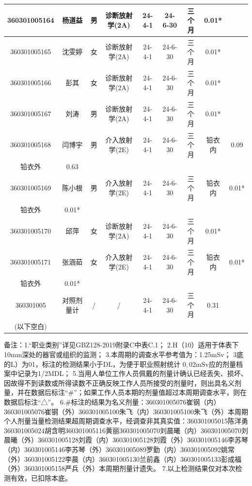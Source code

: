 \begin{table}[H]
\centering
\begin{tabular}{|c|c|c|c|c|c|c|c|c|}
\hline
360301005164 & 杨道益 & 男 & 诊断放射学(2A) & 24-4-1 & 24-6-30 & 三个月 & 0.01* &  \\
\hline
360301005165 & 沈雯婷 & 女 & 诊断放射学(2A) & 24-4-1 & 24-6-30 & 三个月 & 0.01* &  \\
\hline
360301005166 & 彭其 & 女 & 诊断放射学(2A) & 24-4-1 & 24-6-30 & 三个月 & 0.01* &  \\
\hline
360301005167 & 刘涛 & 男 & 诊断放射学(2A) & 24-4-1 & 24-6-30 & 三个月 & 0.01* &  \\
\hline
360301005168 & 闫博宇 & 男 & 介入放射学(2E) & 24-4-1 & 24-6-30 & 三个月 & 铅衣内 & 0.09 \\
\hline
铅衣外 & 0.63 &  &  &  &  &  &  &  \\
\hline
360301005169 & 陈小根 & 男 & 介入放射学(2E) & 24-4-1 & 24-6-30 & 三个月 & 铅衣内 & 0.01* \\
\hline
铅衣外 & 0.01* &  &  &  &  &  &  &  \\
\hline
360301005170 & 邱萍 & 女 & 诊断放射学(2A) & 24-4-1 & 24-6-30 & 三个月 & 0.01* &  \\
\hline
360301005171 & 张涵茹 & 女 & 介入放射学(2E) & 24-4-1 & 24-6-30 & 三个月 & 铅衣内 & 0.01* \\
\hline
铅衣外 & 0.01* &  &  &  &  &  &  &  \\
\hline
360301005 & 对照剂量计 & / & / & 24-4-1 & 24-6-30 & 三个月 & 0.31 &  \\
\hline
(以下空白) &  &  &  &  &  &  &  &  \\
\hline
\end{tabular}
\end{table}


备注：1.“职业类别”详见GBZ128-2019附录C中表C.1；
2.H（10）适用于体表下10mm深处的器官或组织的监测；
3.本周期的调查水平参考值为：1.25mSv；
3底的L）为01，标注的检测结果小于DL，为便于职业照射统计 $0 , 0 2 \mathrm { m S v }$应的剂量档案中记录为1/2MDL；
5.当用人单位工作人员佩戴的剂量计确认已经丢失、损坏、因故得不到读数或所得读数不正确反映工作人员所接受的剂量时，则出具名义剂量，并在数据后标注“\#”；如果工作人员本期的剂量值超过本周期调查水平，则在数据后标注“△”。
6.\#标注的结果为名义剂量：360301005076崔钢（内）360301005076崔钢（外）360301005100朱飞（内）360301005100朱飞（外）本周期个人剂量当量检测结果超周期调查水平，经调查非其真实值：360301005015陈洋勇360301005024胡含明360301005116黄丽360301005070刘晨曦（内）360301005070刘晨曦（外）360301005128刘霞（内）360301005128刘霞（外）360301005146李苏琴（内）360301005146李苏琴（外）360301005089罗勤（内）360301005092姚常（外）360301005122李晨（内）360301005130兰前鑫（内）360301005133彭成福（外）360301005158严兵（外）本周期剂量计遗失。
7.以上检测结果仅对本次检测有效，已扣除本底。

